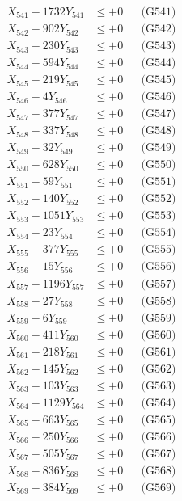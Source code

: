 \documentclass[a4paper,10pt]{article}
\begin{document}
{\begin{align}
\allowbreak
X_{541} - 1732Y_{541} &\leq +0 && \text{(G541)} \\
X_{542} - 902Y_{542} &\leq +0 && \text{(G542)} \\
X_{543} - 230Y_{543} &\leq +0 && \text{(G543)} \\
X_{544} - 594Y_{544} &\leq +0 && \text{(G544)} \\
X_{545} - 219Y_{545} &\leq +0 && \text{(G545)} \\
X_{546} - 4Y_{546} &\leq +0 && \text{(G546)} \\
X_{547} - 377Y_{547} &\leq +0 && \text{(G547)} \\
X_{548} - 337Y_{548} &\leq +0 && \text{(G548)} \\
X_{549} - 32Y_{549} &\leq +0 && \text{(G549)} \\
X_{550} - 628Y_{550} &\leq +0 && \text{(G550)} \\
\allowbreak
X_{551} - 59Y_{551} &\leq +0 && \text{(G551)} \\
X_{552} - 140Y_{552} &\leq +0 && \text{(G552)} \\
X_{553} - 1051Y_{553} &\leq +0 && \text{(G553)} \\
X_{554} - 23Y_{554} &\leq +0 && \text{(G554)} \\
X_{555} - 377Y_{555} &\leq +0 && \text{(G555)} \\
X_{556} - 15Y_{556} &\leq +0 && \text{(G556)} \\
X_{557} - 1196Y_{557} &\leq +0 && \text{(G557)} \\
X_{558} - 27Y_{558} &\leq +0 && \text{(G558)} \\
X_{559} - 6Y_{559} &\leq +0 && \text{(G559)} \\
X_{560} - 411Y_{560} &\leq +0 && \text{(G560)} \\
\allowbreak
X_{561} - 218Y_{561} &\leq +0 && \text{(G561)} \\
X_{562} - 145Y_{562} &\leq +0 && \text{(G562)} \\
X_{563} - 103Y_{563} &\leq +0 && \text{(G563)} \\
X_{564} - 1129Y_{564} &\leq +0 && \text{(G564)} \\
X_{565} - 663Y_{565} &\leq +0 && \text{(G565)} \\
X_{566} - 250Y_{566} &\leq +0 && \text{(G566)} \\
X_{567} - 505Y_{567} &\leq +0 && \text{(G567)} \\
X_{568} - 836Y_{568} &\leq +0 && \text{(G568)} \\
X_{569} - 384Y_{569} &\leq +0 && \text{(G569)} \\

\end{align}}
\end{document}
